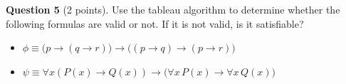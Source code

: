 \documentclass[12pt]{article}
\begin{document}
\vspace{0.2cm}

\noindent\textbf{Question 5} (2 points). Use the tableau algorithm to determine whether the following formulas are valid or not. If it is not valid, is it satisfiable?
\begin{itemize}
    \item[a)] $\phi \equiv \bigl( p \rightarrow (q \rightarrow r) \bigr) \rightarrow \bigl( (p \rightarrow q) \rightarrow (p \rightarrow r) \bigr)$
    \item[b)] $\psi \equiv \forall x (P(x) \rightarrow Q(x)) \rightarrow \bigl( \forall x\, P(x) \rightarrow \forall x\, Q(x) \bigr)$
\end{itemize}
\end{document}
